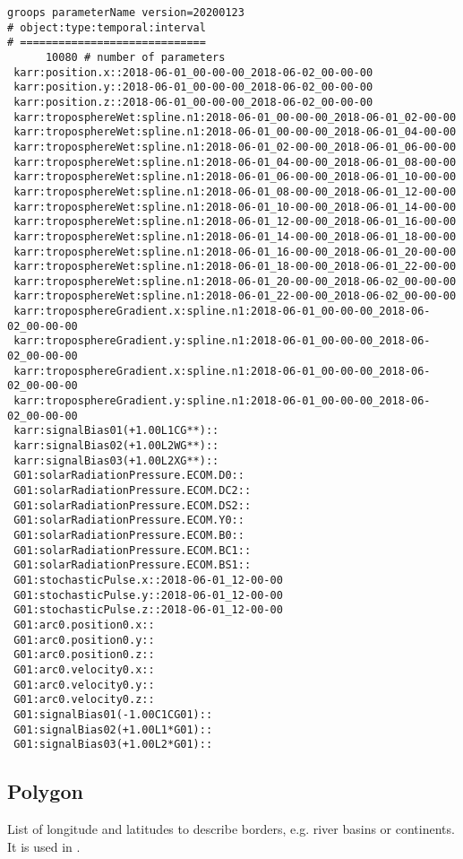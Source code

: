 \begin{verbatim}
groops parameterName version=20200123
# object:type:temporal:interval
# =============================
      10080 # number of parameters
 karr:position.x::2018-06-01_00-00-00_2018-06-02_00-00-00
 karr:position.y::2018-06-01_00-00-00_2018-06-02_00-00-00
 karr:position.z::2018-06-01_00-00-00_2018-06-02_00-00-00
 karr:troposphereWet:spline.n1:2018-06-01_00-00-00_2018-06-01_02-00-00
 karr:troposphereWet:spline.n1:2018-06-01_00-00-00_2018-06-01_04-00-00
 karr:troposphereWet:spline.n1:2018-06-01_02-00-00_2018-06-01_06-00-00
 karr:troposphereWet:spline.n1:2018-06-01_04-00-00_2018-06-01_08-00-00
 karr:troposphereWet:spline.n1:2018-06-01_06-00-00_2018-06-01_10-00-00
 karr:troposphereWet:spline.n1:2018-06-01_08-00-00_2018-06-01_12-00-00
 karr:troposphereWet:spline.n1:2018-06-01_10-00-00_2018-06-01_14-00-00
 karr:troposphereWet:spline.n1:2018-06-01_12-00-00_2018-06-01_16-00-00
 karr:troposphereWet:spline.n1:2018-06-01_14-00-00_2018-06-01_18-00-00
 karr:troposphereWet:spline.n1:2018-06-01_16-00-00_2018-06-01_20-00-00
 karr:troposphereWet:spline.n1:2018-06-01_18-00-00_2018-06-01_22-00-00
 karr:troposphereWet:spline.n1:2018-06-01_20-00-00_2018-06-02_00-00-00
 karr:troposphereWet:spline.n1:2018-06-01_22-00-00_2018-06-02_00-00-00
 karr:troposphereGradient.x:spline.n1:2018-06-01_00-00-00_2018-06-02_00-00-00
 karr:troposphereGradient.y:spline.n1:2018-06-01_00-00-00_2018-06-02_00-00-00
 karr:troposphereGradient.x:spline.n1:2018-06-01_00-00-00_2018-06-02_00-00-00
 karr:troposphereGradient.y:spline.n1:2018-06-01_00-00-00_2018-06-02_00-00-00
 karr:signalBias01(+1.00L1CG**)::
 karr:signalBias02(+1.00L2WG**)::
 karr:signalBias03(+1.00L2XG**)::
 G01:solarRadiationPressure.ECOM.D0::
 G01:solarRadiationPressure.ECOM.DC2::
 G01:solarRadiationPressure.ECOM.DS2::
 G01:solarRadiationPressure.ECOM.Y0::
 G01:solarRadiationPressure.ECOM.B0::
 G01:solarRadiationPressure.ECOM.BC1::
 G01:solarRadiationPressure.ECOM.BS1::
 G01:stochasticPulse.x::2018-06-01_12-00-00
 G01:stochasticPulse.y::2018-06-01_12-00-00
 G01:stochasticPulse.z::2018-06-01_12-00-00
 G01:arc0.position0.x::
 G01:arc0.position0.y::
 G01:arc0.position0.z::
 G01:arc0.velocity0.x::
 G01:arc0.velocity0.y::
 G01:arc0.velocity0.z::
 G01:signalBias01(-1.00C1CG01)::
 G01:signalBias02(+1.00L1*G01)::
 G01:signalBias03(+1.00L2*G01)::
\end{verbatim}


\subsection{Polygon}\label{general.fileFormat:polygon}
List of longitude and latitudes to describe borders, e.g. river basins or continents.
It is used in .

